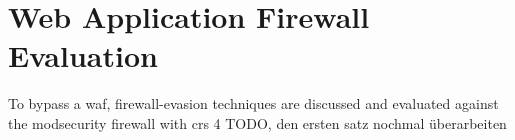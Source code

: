 \section{Web Application Firewall Evaluation}
To bypass a waf, firewall-evasion techniques are discussed and evaluated against the modsecurity firewall with crs 4 {\color{red} TODO, den ersten satz nochmal überarbeiten}
